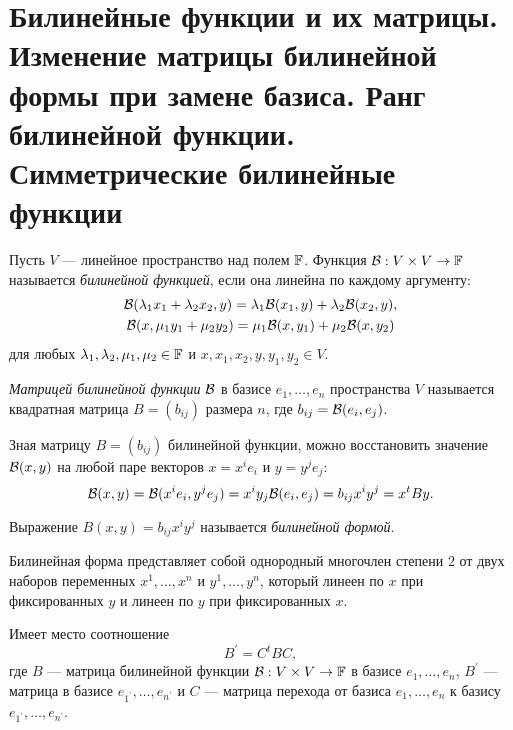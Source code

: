 \section{Билинейные функции и их матрицы. Изменение матрицы билинейной формы при замене базиса. Ранг билинейной функции. Симметрические билинейные функции}

\begin{definition}
    Пусть $V$ --- линейное пространство над полем $\mathbb{F}$. Функция $\mathcal{B}: V \times V \to \mathbb{F}$ называется \textit{билинейной функцией}, если она линейна по каждому аргументу:
    \begin{gather*}
        \mathcal{B}(\lambda_1x_1 + \lambda_2x_2, y) = \lambda_1\mathcal{B}(x_1, y) + \lambda_2\mathcal{B}(x_2, y),\\
        \mathcal{B}(x, \mu_1y_1 + \mu_2y_2) = \mu_1\mathcal{B}(x, y_1) + \mu_2\mathcal{B}(x, y_2)
    \end{gather*}
    для любых $\lambda_1, \lambda_2, \mu_1, \mu_2 \in \mathbb{F}$ и $x, x_1, x_2, y, y_1, y_2 \in V$.
\end{definition}

\begin{definition}
    \textit{Матрицей билинейной функции} $\mathcal{B}$ в базисе $e_1, \ldots, e_n$ пространства $V$ называется квадратная матрица $B = (b_{ij})$ размера $n$, где $b_{ij} = \mathcal{B}(e_i, e_j)$.
\end{definition}

Зная матрицу $B = (b_{ij})$ билинейной функции, можно восстановить значение $\mathcal{B}(x, y)$ на любой паре векторов $x = x^ie_i$ и $y = y^je_j$:
\[
    \mathcal{B}(x, y) = \mathcal{B}(x^ie_i, y^je_j) = x^iy_j\mathcal{B}(e_i, e_j) = b_{ij}x^iy^j = x^tBy.
\]

\begin{definition}
    Выражение $B(x, y) = b_{ij}x^iy^j$ называется \textit{билинейной формой}.
\end{definition}

Билинейная форма представляет собой однородный многочлен степени $2$ от двух наборов переменных $x^1, \ldots, x^n$ и $y^1, \ldots, y^n$, который линеен по $x$ при фиксированных $y$ и линеен по $y$ при фиксированных $x$.

\begin{theorem}
    Имеет место соотношение
    \[
        B^\prime = C^tBC,
    \]
    где $B$ --- матрица билинейной функции $\mathcal{B}: V \times V \to \mathbb{F}$ в базисе $e_1, \ldots, e_n$, $B^\prime$ --- матрица в базисе $e_{1^\prime}, \ldots, e_{n^\prime}$ и $C$ --- матрица перехода от базиса $e_1, \ldots, e_n$ к базису $e_{1^\prime}, \ldots, e_{n^\prime}$.
\end{theorem}

